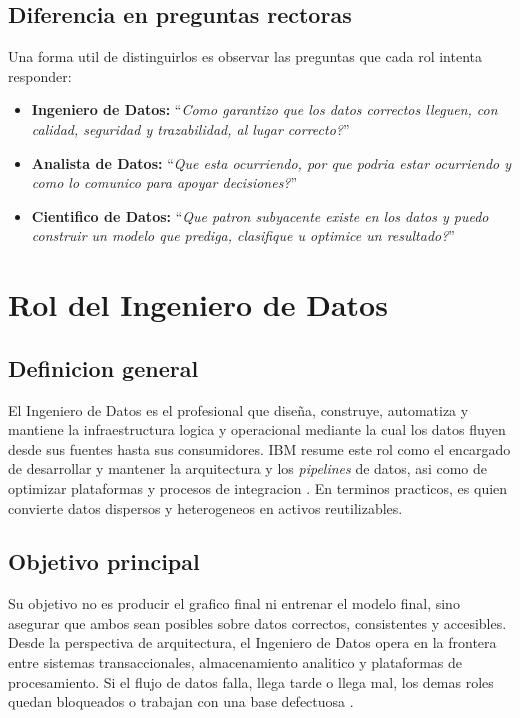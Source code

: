 \documentclass[12pt]{article}
\begin{document}
\subsection{Diferencia en preguntas rectoras}
Una forma util de distinguirlos es observar las preguntas que cada rol intenta responder:
\begin{itemize}[leftmargin=*]
\item \textbf{Ingeniero de Datos:} ``\textit{Como garantizo que los datos correctos lleguen, con calidad, seguridad y trazabilidad, al lugar correcto?}''
\item \textbf{Analista de Datos:} ``\textit{Que esta ocurriendo, por que podria estar ocurriendo y como lo comunico para apoyar decisiones?}''
\item \textbf{Cientifico de Datos:} ``\textit{Que patron subyacente existe en los datos y puedo construir un modelo que prediga, clasifique u optimice un resultado?}''
\end{itemize}

\section{Rol del Ingeniero de Datos}
\subsection{Definicion general}
El Ingeniero de Datos es el profesional que diseña, construye, automatiza y mantiene la infraestructura logica y operacional mediante la cual los datos fluyen desde sus fuentes hasta sus consumidores. IBM resume este rol como el encargado de desarrollar y mantener la arquitectura y los \textit{pipelines} de datos, asi como de optimizar plataformas y procesos de integracion \cite{ibm_roles}. En terminos practicos, es quien convierte datos dispersos y heterogeneos en activos reutilizables.

\subsection{Objetivo principal}
Su objetivo no es producir el grafico final ni entrenar el modelo final, sino asegurar que ambos sean posibles sobre datos correctos, consistentes y accesibles. Desde la perspectiva de arquitectura, el Ingeniero de Datos opera en la frontera entre sistemas transaccionales, almacenamiento analitico y plataformas de procesamiento. Si el flujo de datos falla, llega tarde o llega mal, los demas roles quedan bloqueados o trabajan con una base defectuosa \cite{kimball_dw_toolkit,dama_dmbok}.
\end{document}
